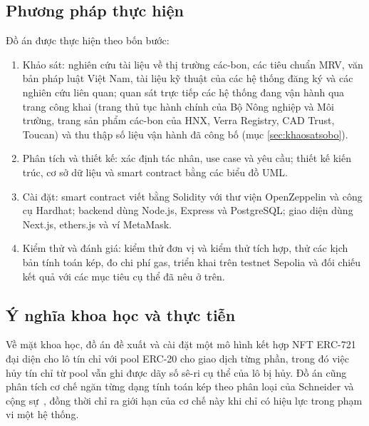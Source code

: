 \subsection*{Phương pháp thực hiện}
\label{subsec:phuongphap}
Đồ án được thực hiện theo bốn bước:
\begin{enumerate}
    \item Khảo sát: nghiên cứu tài liệu về thị trường các-bon, các tiêu chuẩn MRV, văn bản pháp luật Việt Nam, tài liệu kỹ thuật của các hệ thống đăng ký và các nghiên cứu liên quan; quan sát trực tiếp các hệ thống đang vận hành qua trang công khai (trang thủ tục hành chính của Bộ Nông nghiệp và Môi trường, trang sản phẩm các-bon của HNX, Verra Registry, CAD Trust, Toucan) và thu thập số liệu vận hành đã công bố (mục \ref{sec:khaosatsobo}).
    \item Phân tích và thiết kế: xác định tác nhân, use case và yêu cầu; thiết kế kiến trúc, cơ sở dữ liệu và smart contract bằng các biểu đồ UML.
    \item Cài đặt: smart contract viết bằng Solidity với thư viện OpenZeppelin và công cụ Hardhat; backend dùng Node.js, Express và PostgreSQL; giao diện dùng Next.js, ethers.js và ví MetaMask.
    \item Kiểm thử và đánh giá: kiểm thử đơn vị và kiểm thử tích hợp, thử các kịch bản tính toán kép, đo chi phí gas, triển khai trên testnet Sepolia và đối chiếu kết quả với các mục tiêu cụ thể đã nêu ở trên.
\end{enumerate}

\subsection*{Ý nghĩa khoa học và thực tiễn}
\label{subsec:ynghia}
Về mặt khoa học, đồ án đề xuất và cài đặt một mô hình kết hợp NFT ERC-721 đại diện cho lô tín chỉ với pool ERC-20 cho giao dịch từng phần, trong đó việc hủy tín chỉ từ pool vẫn ghi được dãy số sê-ri cụ thể của lô bị hủy. Đồ án cũng phân tích cơ chế ngăn từng dạng tính toán kép theo phân loại của Schneider và cộng sự~\cite{schneider2019double}, đồng thời chỉ ra giới hạn của cơ chế này khi chỉ có hiệu lực trong phạm vi một hệ thống.

